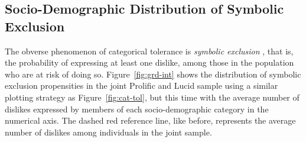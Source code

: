 \documentclass[12pt]{article}
\begin{document}
\subsection*{Socio-Demographic Distribution of Symbolic Exclusion}
The obverse phenomenon of categorical tolerance is \emph{symbolic exclusion} \citep{bryson1996anything-311}, that is, the probability of expressing at least one dislike, among those in the population who are at risk of doing so. Figure~\ref{fig:grd-int} shows the distribution of symbolic exclusion propensities in the joint Prolific and Lucid sample using a similar plotting strategy as Figure~\ref{fig:cat-tol}, but this time with the average number of dislikes expressed by members of each socio-demographic category in the numerical axis. The dashed red reference line, like before, represents the average number of dislikes among individuals in the joint sample. 
\end{document}
